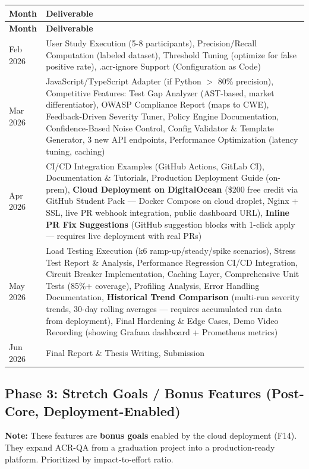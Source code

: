 \documentclass[11pt,a4paper]{article}
\begin{document}
\begin{longtable}{p{3cm}p{11cm}}
\toprule
\textbf{Month} & \textbf{Deliverable} \\
\midrule
\endfirsthead
\toprule
\textbf{Month} & \textbf{Deliverable} \\
\midrule
\endhead
Feb 2026 & User Study Execution (5-8 participants), Precision/Recall Computation (labeled dataset), Threshold Tuning (optimize for false positive rate), .acr-ignore Support (Configuration as Code) \\
\midrule
Mar 2026 & JavaScript/TypeScript Adapter (if Python $>$ 80\% precision), Competitive Features: Test Gap Analyzer (AST-based, market differentiator), OWASP Compliance Report (maps to CWE), Feedback-Driven Severity Tuner, Policy Engine Documentation, Confidence-Based Noise Control, Config Validator \& Template Generator, 3 new API endpoints, Performance Optimization (latency tuning, caching) \\
\midrule
Apr 2026 & CI/CD Integration Examples (GitHub Actions, GitLab CI), Documentation \& Tutorials, Production Deployment Guide (on-prem), \textbf{Cloud Deployment on DigitalOcean} (\$200 free credit via GitHub Student Pack --- Docker Compose on cloud droplet, Nginx + SSL, live PR webhook integration, public dashboard URL), \textbf{Inline PR Fix Suggestions} (GitHub suggestion blocks with 1-click apply --- requires live deployment with real PRs) \\
\midrule
May 2026 & Load Testing Execution (k6 ramp-up/steady/spike scenarios), Stress Test Report \& Analysis, Performance Regression CI/CD Integration, Circuit Breaker Implementation, Caching Layer, Comprehensive Unit Tests (85\%+ coverage), Profiling Analysis, Error Handling Documentation, \textbf{Historical Trend Comparison} (multi-run severity trends, 30-day rolling averages --- requires accumulated run data from deployment), Final Hardening \& Edge Cases, Demo Video Recording (showing Grafana dashboard + Prometheus metrics) \\
\midrule
Jun 2026 & Final Report \& Thesis Writing, Submission \\
\bottomrule
\end{longtable}

\subsection{Phase 3: Stretch Goals / Bonus Features (Post-Core, Deployment-Enabled)}

\textbf{Note:} These features are \textbf{bonus goals} enabled by the cloud deployment (F14). They expand ACR-QA from a graduation project into a production-ready platform. Prioritized by impact-to-effort ratio.
\end{document}
